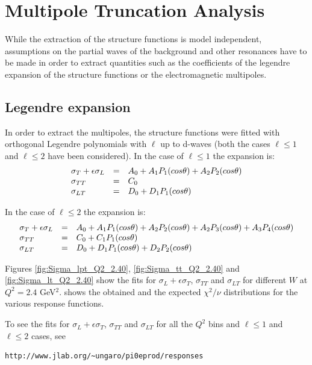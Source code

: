 \section{Multipole Truncation Analysis}
While the extraction of the structure functions is model independent, 
assumptions on the partial waves of the background and other resonances have to be made
in order to extract quantities such as the coefficients of the legendre expansion of the 
structure functions or the electromagnetic multipoles.
 

\subsection{Legendre expansion}
\label{sec:legendre}
In order to extract the multipoles, the structure functions were fitted
with orthogonal Legendre polynomials with $\ell$ up to d-waves (both the cases
$\ell\le 1$ and $\ell \le 2$ have been considered).
In the case of $\ell \le 1$ the expansion is:
$$
\begin{array}{l c l}
\sigma_T + \epsilon\sigma_L & = & A_0 + A_1P_1(cos\theta) + A_2P_2(cos\theta) \\
\sigma_{TT}                 & = & C_0 \\
\sigma_{LT}                 & = & D_0 + D_1P_1(cos\theta)  \\
\end{array}
$$

In the case of $\ell \le 2$ the expansion is:
$$
\begin{array}{l c l}
\sigma_T + \epsilon\sigma_L & = & A_0 + A_1P_1(cos\theta) + A_2P_2(cos\theta) + A_2P_3(cos\theta) + A_3P_4(cos\theta)\\
\sigma_{TT}                 & = & C_0 + C_1P_1(cos\theta) \\
\sigma_{LT}                 & = & D_0 + D_1P_1(cos\theta) + D_2P_2(cos\theta) \\
\end{array}
$$


Figures \ref{fig:Sigma_lpt_Q2_2.40},  \ref{fig:Sigma_tt_Q2_2.40} and \ref{fig:Sigma_lt_Q2_2.40} show 
the fits for $\sigma_L + \epsilon\sigma_T$, $\sigma_{TT}$ and $\sigma_{LT}$ for different 
$W$ at $Q^2 = 2.4$ GeV$^2$. 
 shows the obtained and the expected $\chi^2/\nu$ distributions for the various response functions.

To see the fits for $\sigma_L + \epsilon\sigma_T$, $\sigma_{TT}$ and $\sigma_{LT}$ for all the 
$Q^2$ bins and $\ell\le 1$ and $\ell \le 2$ cases, see
\begin{verbatim} 
http://www.jlab.org/~ungaro/pi0eprod/responses
\end{verbatim}

